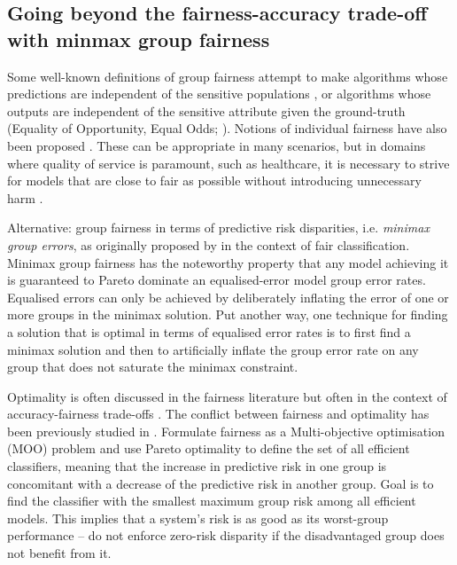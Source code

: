 %
\subsection{Going beyond the fairness-accuracy trade-off with minmax group
fairness}\label{ssec:minmax-fairness}

Some well-known definitions of group fairness attempt to make algorithms whose predictions are
independent of the sensitive populations \citep{zemel, feldman2015certifying}, or algorithms whose
outputs are independent of the sensitive attribute given the ground-truth (Equality of Opportunity,
Equal Odds; \cite{hardt2016equality, woodworth2017learning}).
%
Notions of individual fairness have also been proposed \citep{dwork2012fairness}.
%
These can be appropriate in many scenarios, but in domains where quality of service is paramount,
such as healthcare, it is necessary to strive for models that are close to fair as possible without
introducing unnecessary harm \citep{ustun2019fairness}.

Alternative: group fairness in terms of predictive risk disparities, i.e. \emph{minimax group
errors}, as originally proposed by \cite{martinez2020minimax} in the context of fair
classification.
%
Minimax group fairness has the noteworthy property that any model achieving it is guaranteed to
Pareto dominate an equalised-error model \wrt{} group error rates.
Equalised errors can only be achieved by deliberately inflating the error of one or more groups in
the minimax solution.
%
Put another way, one technique for finding a solution that is optimal in terms of equalised error
rates is to first find a minimax solution and then to artificially  inflate the group error rate on
any group that does not saturate the minimax constraint.

Optimality is often discussed in the fairness literature but often in the context of
accuracy-fairness trade-offs \citep{kearns2018preventing, kearns2019ethical}.
The conflict between fairness and optimality has been previously studied in
\cite{kaplow1999conflict}.
%
Formulate fairness as a Multi-objective optimisation (MOO) problem and use Pareto optimality
\citep{sawaragi1985theory} to
define the set of all efficient classifiers, meaning that the increase in predictive risk in one
group is concomitant with a decrease of the predictive risk in another group.
Goal is to find the classifier with the smallest maximum group risk among all efficient models.
This implies that a system's risk is as good as its worst-group performance -- do not enforce
zero-risk disparity if the disadvantaged group does not benefit from it.

